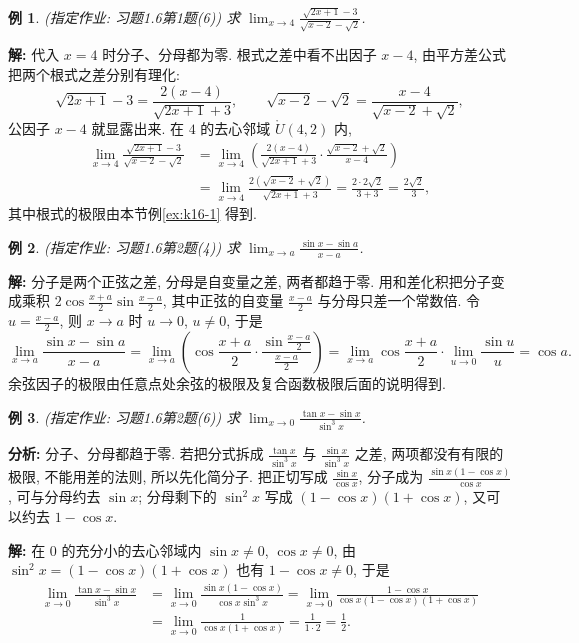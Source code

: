 \documentclass[UTF8,openany]{ctexbook}
\theoremstyle{chinesetextbook}
\newtheorem{example}{例}[section]
\newenvironment{cnsolution}{\par\indent\textbf{解:} \ignorespaces}{\par}
\begin{document}
\begin{example}
\textnormal{(指定作业: 习题1.6第1题(6))} 求 $\displaystyle\lim_{x\to4}\frac{\sqrt{2x+1}-3}{\sqrt{x-2}-\sqrt2}$.
\end{example}
\begin{cnsolution}
代入 $x=4$ 时分子、分母都为零. 根式之差中看不出因子 $x-4$, 由平方差公式把两个根式之差分别有理化:
\[
\sqrt{2x+1}-3=\frac{2(x-4)}{\sqrt{2x+1}+3},\qquad\sqrt{x-2}-\sqrt2=\frac{x-4}{\sqrt{x-2}+\sqrt2},
\]
公因子 $x-4$ 就显露出来. 在 $4$ 的去心邻域 $\mathring U(4,2)$ 内,
\[
\begin{aligned}
\lim_{x\to4}\frac{\sqrt{2x+1}-3}{\sqrt{x-2}-\sqrt2}
&=\lim_{x\to4}\left(\frac{2(x-4)}{\sqrt{2x+1}+3}\cdot\frac{\sqrt{x-2}+\sqrt2}{x-4}\right)\\
&=\lim_{x\to4}\frac{2\left(\sqrt{x-2}+\sqrt2\right)}{\sqrt{2x+1}+3}=\frac{2\cdot2\sqrt2}{3+3}=\frac{2\sqrt2}3,
\end{aligned}
\]
其中根式的极限由本节例\ref{ex:k16-1} 得到.
\end{cnsolution}
\begin{example}
\textnormal{(指定作业: 习题1.6第2题(4))} 求 $\displaystyle\lim_{x\to a}\frac{\sin x-\sin a}{x-a}$.
\end{example}
\begin{cnsolution}
分子是两个正弦之差, 分母是自变量之差, 两者都趋于零. 用和差化积把分子变成乘积 $\displaystyle2\cos\frac{x+a}2\sin\frac{x-a}2$, 其中正弦的自变量 $\displaystyle\frac{x-a}2$ 与分母只差一个常数倍. 令 $\displaystyle u=\frac{x-a}2$, 则 $x\to a$ 时 $u\to0$, $u\ne0$, 于是
\[
\lim_{x\to a}\frac{\sin x-\sin a}{x-a}=\lim_{x\to a}\left(\cos\frac{x+a}2\cdot\frac{\sin\frac{x-a}2}{\frac{x-a}2}\right)=\lim_{x\to a}\cos\frac{x+a}2\cdot\lim_{u\to0}\frac{\sin u}u=\cos a.
\]
余弦因子的极限由任意点处余弦的极限及复合函数极限后面的说明得到.
\end{cnsolution}
\begin{example}
\textnormal{(指定作业: 习题1.6第2题(6))} 求 $\displaystyle\lim_{x\to0}\frac{\tan x-\sin x}{\sin^3x}$.
\end{example}
\par\indent\textbf{分析:} 分子、分母都趋于零. 若把分式拆成 $\displaystyle\frac{\tan x}{\sin^3x}$ 与 $\displaystyle\frac{\sin x}{\sin^3x}$ 之差, 两项都没有有限的极限, 不能用差的法则, 所以先化简分子. 把正切写成 $\displaystyle\frac{\sin x}{\cos x}$, 分子成为 $\displaystyle\frac{\sin x(1-\cos x)}{\cos x}$, 可与分母约去 $\sin x$; 分母剩下的 $\sin^2x$ 写成 $(1-\cos x)(1+\cos x)$, 又可以约去 $1-\cos x$.
\begin{cnsolution}
在 $0$ 的充分小的去心邻域内 $\sin x\ne0$, $\cos x\ne0$, 由 $\sin^2x=(1-\cos x)(1+\cos x)$ 也有 $1-\cos x\ne0$, 于是
\[
\begin{aligned}
\lim_{x\to0}\frac{\tan x-\sin x}{\sin^3x}
&=\lim_{x\to0}\frac{\sin x(1-\cos x)}{\cos x\sin^3x}=\lim_{x\to0}\frac{1-\cos x}{\cos x(1-\cos x)(1+\cos x)}\\
&=\lim_{x\to0}\frac1{\cos x(1+\cos x)}=\frac1{1\cdot2}=\frac12.
\end{aligned}
\]
\end{cnsolution}
\end{document}
